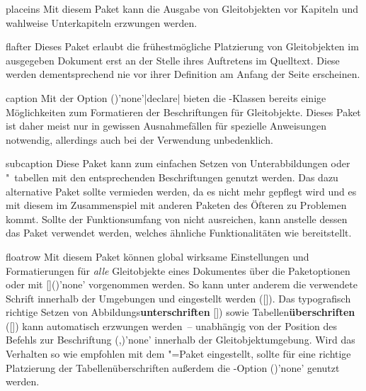 \begin{packages}
\item[placeins]
  Mit diesem Paket kann die Ausgabe von Gleitobjekten vor Kapiteln und wahlweise
  Unterkapiteln erzwungen werden.
\item[flafter]
  Dieses Paket erlaubt die frühestmögliche Platzierung von Gleitobjekten im 
  ausgegeben Dokument erst an der Stelle ihres Auftretens im Quelltext. Diese 
  werden dementsprechend nie vor ihrer Definition am Anfang der Seite 
  erscheinen.
\item[caption]
  Mit der Option ()'none'|declare| 
  bieten die \KOMAScript-Klassen bereits einige Möglichkeiten zum Formatieren 
  der Beschriftungen für Gleitobjekte. Dieses Paket ist daher meist nur in 
  gewissen Ausnahmefällen für spezielle Anweisungen notwendig, allerdings auch 
  bei der Verwendung unbedenklich.
\item[subcaption]
  Diese Paket kann zum einfachen Setzen von Unterabbildungen oder "~tabellen 
  mit den entsprechenden Beschriftungen genutzt werden. Das dazu alternative 
  Paket  sollte vermieden werden, da es nicht mehr gepflegt 
  wird und es mit diesem im Zusammenspiel mit anderen Paketen des Öfteren zu 
  Problemen kommt. Sollte der Funktionsumfang von  nicht 
  ausreichen, kann anstelle dessen das Paket  verwendet 
  werden, welches ähnliche Funktionalitäten wie  bereitstellt.
\item[floatrow]
  Mit diesem Paket können global wirksame Einstellungen und Formatierungen für 
  \emph{alle} Gleitobjekte eines Dokumentes über die Paketoptionen oder mit 
  [\PParameter{\dots}]()'none' 
  vorgenommen werden. So kann unter anderem die verwendete Schrift innerhalb 
  der Umgebungen  und  eingestellt 
  werden ([]). Das typografisch 
  richtige Setzen von Abbildungs\textbf{unterschriften} 
  [])
  sowie Tabellen\textbf{überschriften} 
  ([])
  kann automatisch erzwungen werden~-- unabhängig von der Position des Befehls 
  zur Beschriftung 
  (,)'none' 
  innerhalb der Gleitobjektumgebung. Wird das Verhalten so wie empfohlen mit 
  dem "=Paket eingestellt, sollte für eine richtige 
  Platzierung der Tabellenüberschriften außerdem die \KOMAScript-Option 
  ()'none'
  genutzt werden.
%
\end{packages}


